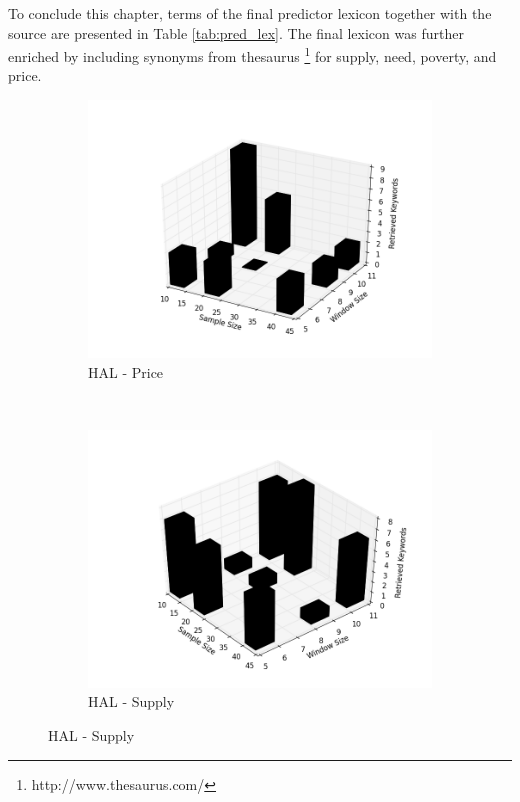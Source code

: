 To conclude this chapter, terms of the final predictor lexicon together with the source are presented in Table \ref{tab:pred_lex}. The final lexicon was further enriched by including synonyms from thesaurus \footnote{http://www.thesaurus.com/}  for supply, need, poverty, and price. 


\begin{figure}[H]
        \centering
        \begin{subfigure}[b]{0.45\textwidth}
                \includegraphics[width=\textwidth]{img/lex/price_hal_2}
                \caption{HAL - Price}
                \label{fig:al_price}
        \end{subfigure}%
        ~ %
        \begin{subfigure}[b]{0.45\textwidth}
                \includegraphics[width=\textwidth]{img/lex/supply_hal_2}
                \caption{HAL - Supply}
                \label{fig:hal_supply}
        \end{subfigure}
        

\end{figure}
